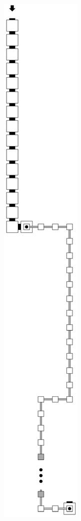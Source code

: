\begin{figure}[H]
    \centering
    \begin{minipage}[b]{.64\textwidth}
        \centering
        \begin{subfigure}[t]{0.3\textwidth}
            \centering
            \includegraphics[width=.3\textwidth]{return_paths_read_next_1-or-2_op}

\end{subfigure}
\end{minipage}
\end{figure}
